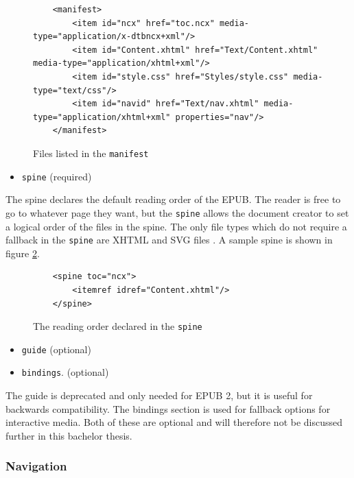 \begin{figure}
	\begin{lstlisting}
	<manifest>
		<item id="ncx" href="toc.ncx" media-type="application/x-dtbncx+xml"/>
		<item id="Content.xhtml" href="Text/Content.xhtml" media-type="application/xhtml+xml"/>
		<item id="style.css" href="Styles/style.css" media-type="text/css"/>
		<item id="navid" href="Text/nav.xhtml" media-type="application/xhtml+xml" properties="nav"/>
	</manifest>
	\end{lstlisting}
	\caption{Files listed in the \lstinline{manifest}}
	\label{fig:manifest}
\end{figure}

\begin{itemize}
	\item \lstinline{spine} (required)
\end{itemize}

The spine declares the default reading order of the EPUB. The reader is free to go to whatever page they want, but the \lstinline|spine| allows the document creator to set a logical order of the files in the spine. The only file types which do not require a fallback in the \lstinline|spine| are XHTML and SVG files \cite{EPUB3bp}. A sample spine is shown in figure \ref{fig:spine}.

\begin{figure}
	\begin{lstlisting}
	<spine toc="ncx">
		<itemref idref="Content.xhtml"/>
	</spine>
	\end{lstlisting}
	\caption{The reading order declared in the \lstinline{spine}}
	\label{fig:spine}
\end{figure}
\begin{itemize}
	\item \lstinline{guide} (optional)
\end{itemize}
\begin{itemize}
	\item \lstinline{bindings}. (optional)
\end{itemize}
The guide is deprecated and only needed for EPUB 2, but it is useful for backwards compatibility. The bindings section is used for fallback options for interactive media. Both of these are optional and will therefore not be discussed further in this bachelor thesis.

\subsubsection{Navigation}

